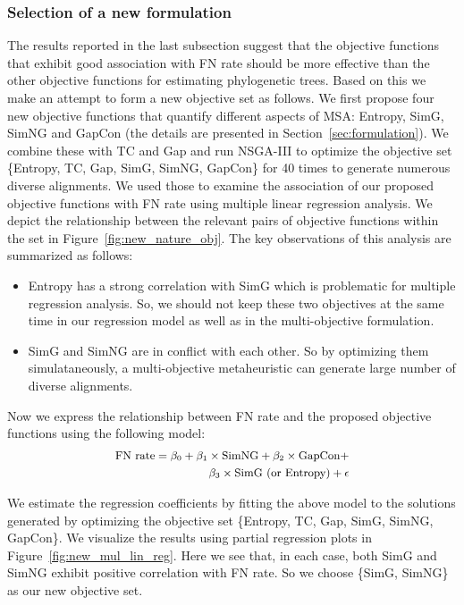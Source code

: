 \subsubsection{Selection of a new formulation}
\label{sec:new_msa_formulation}
The results reported in the last subsection suggest that the objective functions that exhibit good association with FN rate should be more effective than the other objective functions for estimating phylogenetic trees. Based on this we make an attempt to form a new objective set as follows. We first propose four new objective functions that quantify different aspects of MSA: Entropy, SimG, SimNG and GapCon (the details are presented in Section~\ref{sec:formulation}). We combine these with TC and Gap and run NSGA-III to optimize the objective set \{Entropy, TC, Gap, SimG, SimNG, GapCon\} for 40 times to generate numerous diverse alignments. We used those to examine the association of our proposed objective functions with FN rate using multiple linear regression analysis. We depict the relationship between the relevant pairs of objective functions within the set in Figure~\ref{fig:new_nature_obj}. The key observations of this analysis are summarized as follows: 

\begin{itemize}
	\item Entropy has a strong correlation with SimG which is problematic for multiple regression analysis. So, we should not keep these two objectives at the same time in our regression model as well as in the multi-objective formulation.
	
	\item SimG and SimNG are in conflict with each other. So by optimizing them simulataneously, a multi-objective metaheuristic can generate large number of diverse alignments.
\end{itemize}

Now we express the relationship between FN rate and the proposed objective functions using the following model:
\begin{equation}
\small
\begin{split}
\text{FN rate} = \beta_0 + \beta_1 \times \text{SimNG}+ \beta_2 \times \text{GapCon} + \\
\beta_3 \times \text{SimG (or Entropy)} + \epsilon \label{eq:new_multi_lin_reg}
\end{split}
\end{equation}

We estimate the regression coefficients by fitting the above model to the solutions generated by optimizing the objective set \{Entropy, TC, Gap, SimG, SimNG, GapCon\}. We visualize the results using partial regression plots in Figure~\ref{fig:new_mul_lin_reg}. Here we see that, in each case, both SimG and SimNG exhibit positive correlation with FN rate. So we choose \{SimG, SimNG\} as our new objective set.

